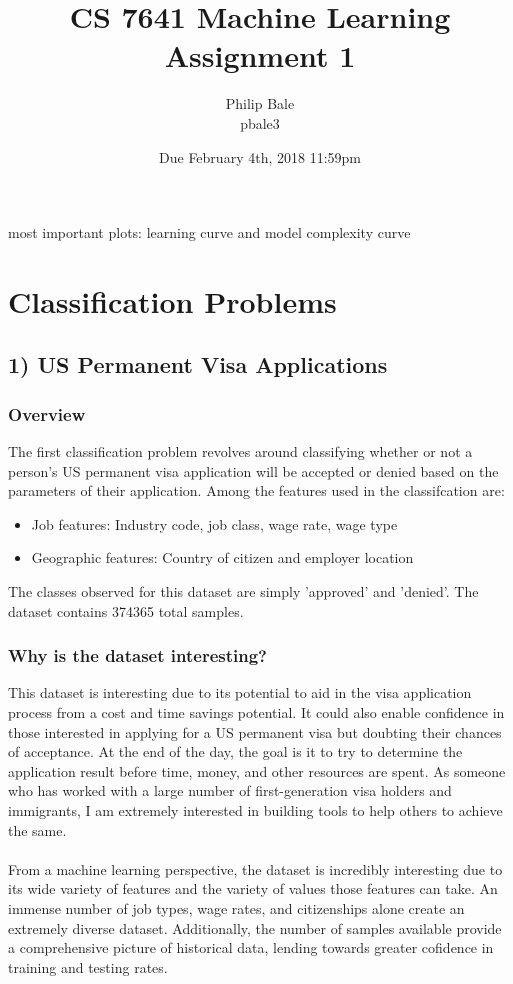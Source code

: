 \documentclass[h]{article}
\title{CS 7641 Machine Learning \\ Assignment 1}
\date{Due February 4th, 2018 11:59pm}
\author{Philip Bale \\ pbale3}
\begin{document}
 most important plots: learning curve and model complexity curve

\section*{Classification Problems}
\subsection*{1) US Permanent Visa Applications}  
\subsubsection*{Overview}
The first classification problem revolves around classifying whether or not a 
person's US permanent visa application will be accepted or denied based on the parameters of 
their application.  Among the features used in the classifcation are:
\begin{itemize}
  \item Job features: Industry code, job class, wage rate, wage type
  \item Geographic features: Country of citizen and employer location
\end{itemize}
The classes observed for this dataset are simply 'approved' and 'denied'.  The 
dataset contains 374365 total samples.
\subsubsection*{Why is the dataset interesting?}
This dataset is interesting due to its potential to aid in the visa application 
process from a cost and time savings potential.  It could also enable confidence in those 
interested in applying for a US permanent visa but doubting their chances of 
acceptance.  At the end of the day, the goal is it to try to determine the application result 
before time, money, and other resources are spent.  As someone who has worked 
with a large number of first-generation visa holders and immigrants, I am 
extremely interested in building tools to help others to achieve the same.
\\ \\
From a machine learning perspective, the dataset is incredibly interesting due 
to its wide variety of features and the variety of values those features can take. 
 An immense number of job types, wage rates, and citizenships alone create an 
 extremely diverse dataset.  Additionally, the number of samples available 
 provide a comprehensive picture of historical data, lending towards greater 
 cofidence in training and testing rates.
\end{document}

